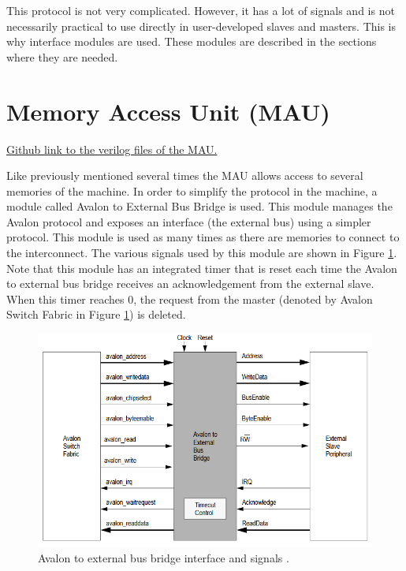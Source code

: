 This protocol is not very complicated. However, it has a lot of signals and is not necessarily 
practical to use directly in user-developed slaves and masters. This is why interface modules are 
used. These modules are described in the sections where they are needed.

\section{Memory Access Unit (MAU)}

\href{https://github.com/AnotherGitAccount/TFE/tree/master/hardware/rtl/mau}{Github link to the verilog files of the MAU.}

Like previously mentioned several times the MAU allows access to several memories of the machine. In order 
to simplify the protocol in the machine, a module called Avalon to External Bus Bridge is used. This 
module manages the Avalon protocol and exposes an interface (the external bus) using a simpler 
protocol. This module is used as many times as there are memories to connect to the interconnect.
The various signals used by this module are shown in Figure \ref{fig:mau/bus_bridge}. Note that this
module has an integrated timer that is reset each time the Avalon to external bus bridge receives
an acknowledgement from the external slave. When this timer reaches 0, the request from the master 
(denoted by Avalon Switch Fabric in Figure \ref{fig:mau/bus_bridge}) is deleted.

\begin{figure}[ht!]
    \center
    \includegraphics[scale=0.8]{"Chapter5-MAU_CTRLU/res/external_bus_bridge.PNG"}
    \caption{Avalon to external bus bridge interface and signals \cite{bus}.}
    \label{fig:mau/bus_bridge}
\end{figure}

